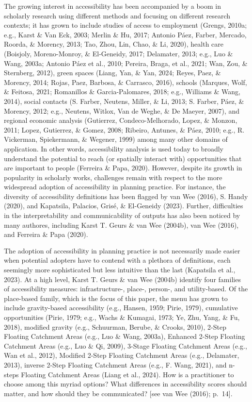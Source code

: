 \documentclass[
11pt, %
oneside, %
english, %
singlespacing, %
]{macthesis} %
\begin{document}
The growing interest in accessibility has been accompanied by a boom in scholarly research using different methods and focusing on different research contexts; it has grown to include studies of access to employment (Grengs, 2010a; e.g., Karst \& Van Eck, 2003; Merlin \& Hu, 2017; Antonio Páez, Farber, Mercado, Roorda, \& Morency, 2013; Tao, Zhou, Lin, Chao, \& Li, 2020), health care (Boisjoly, Moreno-Monroy, \& El-Geneidy, 2017; Delamater, 2013; e.g., Luo \& Wang, 2003a; Antonio Páez et al., 2010; Pereira, Braga, et al., 2021; Wan, Zou, \& Sternberg, 2012), green spaces (Liang, Yan, \& Yan, 2024; Reyes, Paez, \& Morency, 2014; Rojas, Paez, Barbosa, \& Carrasco, 2016), schools (Marques, Wolf, \& Feitosa, 2021; Romanillos \& Garcia-Palomares, 2018; e.g., Williams \& Wang, 2014), social contacts (S. Farber, Neutens, Miller, \& Li, 2013; S. Farber, Páez, \& Morency, 2012; e.g., Neutens, Witlox, Van de Weghe, \& De Maeyer, 2007), and regional economic analysis (Gutierrez, Condeco-Melhorado, Lopez, \& Monzon, 2011; Lopez, Gutierrez, \& Gomez, 2008; Ribeiro, Antunes, \& Páez, 2010; e.g., R. Vickerman, Spiekermann, \& Wegener, 1999) among many other domains of application. In other words, accessibility analysis is used today to broadly understand the potential to reach (or spatially interact with) opportunities that are important to people (Ferreira \& Papa, 2020). However, despite its growth in popularity in scholarly works, challenges remain with respect to the more widespread adoption of accessibility in planning practice. For instance, the diversity of accessibility definitions has been flagged by van Wee (2016), S. Handy (2020), and Kapatsila, Palacios, Grisé, \& El-Geneidy (2023). Further, difficulties in the interpretability and communicability of outputs has also been noticed by many authores, including Karst T. Geurs \& van Wee (2004b), van Wee (2016), and Ferreira \& Papa (2020).

The adoption of accessibility in planning practice is not necessarily made easier when potential adopters have to contend with a plethora of definitions, each seemingly more sophisticated but less intuitive than the last (Kapatsila et al., 2023). At a high level, Karst T. Geurs \& van Wee (2004b) identify four families of accessibility measures: infrastructure-, place-, person-, and utility-based. Of the place-based family, which is the focus of this paper, the menu has grown to include gravity-based accessibility (e.g., Hansen, 1959; Pirie, 1979), cumulative opportunities (Pirie, 1979; e.g., Wachs \& Kumagai, 1973; Ye, Zhu, Yang, \& Fu, 2018), modified gravity (e.g., Schuurman, Berube, \& Crooks, 2010), 2-Step Floating Catchment Areas (e.g., Luo \& Wang, 2003a), Enhanced 2-Step Floating Catchment Areas (e.g., Luo \& Qi, 2009), 3-Stage Floating Catchment Areas (e.g., Wan et al., 2012), Modified 2-Step Floating Catchment Areas (e.g., Delamater, 2013), inverse 2-Step Floating Catchment Areas (e.g., F. Wang, 2021), and n-steps Floating Catchment Areas (Liang et al., 2024). How is a practitioner to choose among this myriad options? What differences in accessibility scores should matter, and how should they be communicated? {[}see van Wee (2016); p.~14{]}.
\end{document}
